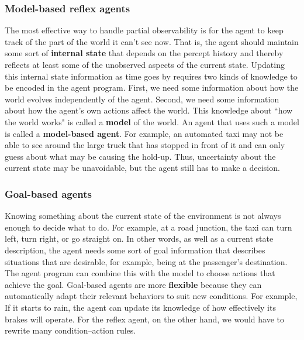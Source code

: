 \subsubsection{Model-based reflex agents}
The most effective way to handle partial observability is for the agent to keep track of the part of the world it can’t see now. That is, the agent should maintain some sort of \textbf{internal state} that depends on the percept history and thereby reflects at least some of the unobserved aspects of the current state.\newline\newline
Updating this internal state information as time goes by requires two kinds of knowledge to be encoded in the agent program.  First, we need some information about how the world evolves independently of the agent.  Second, we need some information about how the agent’s own actions affect the world. This knowledge about “how the world works" is called a \textbf{model} of the world. An agent that uses such a model is called a \textbf{model-based agent}.  For example, an automated taxi may not be able to see around the large truck that has stopped in front of it and can only guess about what may be causing the hold-up. Thus, uncertainty about the current state may be unavoidable, but the agent still has to make a decision.

\subsubsection{Goal-based agents}
Knowing something about the current state of the environment is not always enough to decide what to do. For example, at a road junction, the taxi can turn left, turn right, or go straight on. In other words, as well as a current state description, the agent needs some sort of goal information that describes situations that are desirable, for example, being at the passenger’s destination.  The agent program can combine this with the model to choose actions that achieve the goal.\newline\newline
Goal-based agents are more \textbf{flexible} because they can automatically adapt their relevant behaviors to suit new conditions. For example, If it starts to rain, the agent can update its knowledge of how effectively its brakes will operate. For the reflex agent, on the other hand, we would have to rewrite many condition–action rules.

